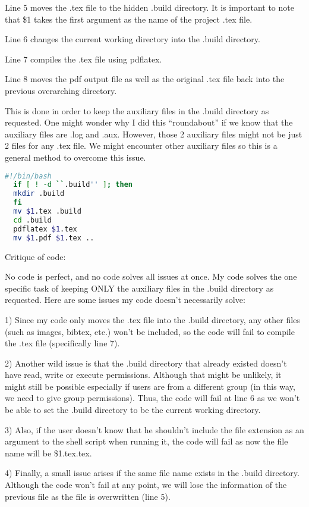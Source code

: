 \documentclass{article}
\begin{document}
Line 5 moves the .tex file to the hidden .build directory. It is important to note that \$1 takes the first argument as the name of the project .tex file.

Line 6 changes the current working directory into the .build directory.

Line 7 compiles the .tex file using pdflatex.

Line 8 moves the pdf output file as well as the original .tex file back into the previous overarching directory.

This is done in order to keep the auxiliary files in the .build directory as requested. One might wonder why I did this ``roundabout'' if we know that the auxiliary files are .log and .aux. However, those 2 auxiliary files might not be just 2 files for any .tex file. We might encounter other auxiliary files so this is a general method to overcome this issue.

\begin{lstlisting}[language=bash, basicstyle=\ttfamily, caption={Shell script of Part 1}]
  #!/bin/bash
  if [ ! -d ``.build'' ]; then
  mkdir .build
  fi
  mv $1.tex .build
  cd .build
  pdflatex $1.tex
  mv $1.pdf $1.tex ..
\end{lstlisting}

Critique of code:

No code is perfect, and no code solves all issues at once. My code solves the one specific task of keeping ONLY the auxiliary files in the .build directory as requested. Here are some issues my code doesn't necessarily solve:

1) Since my code only moves the .tex file into the .build directory, any other files (such as images, bibtex, etc.) won't be included, so the code will fail to compile the .tex file (specifically line 7).

2) Another wild issue is that the .build directory that already existed doesn't have read, write or execute permissions. Although that might be unlikely, it might still be possible especially if users are from a different group (in this way, we need to give group permissions). Thus, the code will fail at line 6 as we won't be able to set the .build directory to be the current working directory.

3) Also, if the user doesn't know that he shouldn't include the file extension as an argument to the shell script when running it, the code will fail as now the file name will be \$1.tex.tex.

4) Finally, a small issue arises if the same file name exists in the .build directory. Although the code won't fail at any point, we will lose the information of the previous file as the file is overwritten (line 5).
\end{document}

